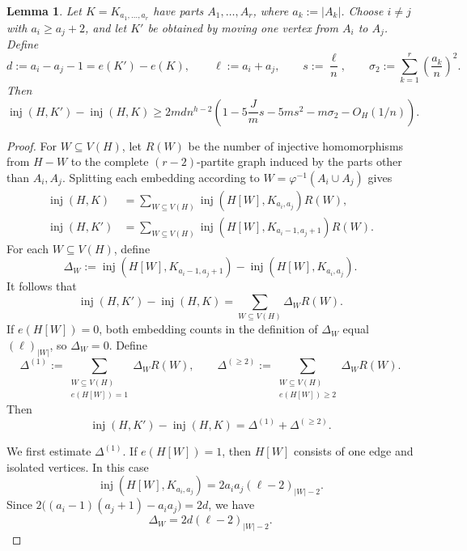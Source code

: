 \documentclass[10pt,a4paper]{amsart}
\newtheorem{lemma}{Lemma}
\newcommand{\inj}{\operatorname{inj}}
\begin{document}
\begin{lemma}
\label{lem:balancing}
Let $K=K_{a_1,\ldots,a_r}$ have parts $A_1,\ldots,A_r$, where $a_k:=|A_k|$. Choose $i\ne j$ with $a_i\ge a_j+2$, and let $K'$ be obtained by moving one vertex from $A_i$ to $A_j$. Define
\[
d:=a_i-a_j-1=e(K')-e(K),\qquad
\ell:=a_i+a_j,\qquad
s:=\frac{\ell}{n},\qquad
\sigma_2:=\sum_{k=1}^r\left(\frac{a_k}{n}\right)^2.
\]
Then
\[
\inj(H,K')-\inj(H,K)
\ge 2mdn^{h-2}\left(1-5\frac{J}{m}s-5ms^2-m\sigma_2-O_H(1/n)\right).
\]
\end{lemma}

\begin{proof}
For $W\subseteq V(H)$, let $R(W)$ be the number of injective homomorphisms from $H-W$ to the complete $(r-2)$-partite graph induced by the parts other than $A_i,A_j$. Splitting each embedding according to $W=\varphi^{-1}(A_i\cup A_j)$ gives
\begin{align*}
\inj(H,K)
&=\sum_{W\subseteq V(H)}\inj(H[W],K_{a_i,a_j})R(W),\\
\inj(H,K')
&=\sum_{W\subseteq V(H)}\inj(H[W],K_{a_i-1,a_j+1})R(W).
\end{align*}
For each $W\subseteq V(H)$, define
\[
\Delta_W:=\inj(H[W],K_{a_i-1,a_j+1})-\inj(H[W],K_{a_i,a_j}).
\]
It follows that
\[
\inj(H,K')-\inj(H,K)=\sum_{W\subseteq V(H)}\Delta_WR(W).
\]
If $e(H[W])=0$, both embedding counts in the definition of $\Delta_W$ equal $(\ell)_{|W|}$, so $\Delta_W=0$. Define
\[
\Delta^{(1)}
:=\sum_{\substack{W\subseteq V(H)\\e(H[W])=1}}\Delta_WR(W),
\qquad
\Delta^{(\ge2)}
:=\sum_{\substack{W\subseteq V(H)\\e(H[W])\ge2}}\Delta_WR(W).
\]
Then
\[
\inj(H,K')-\inj(H,K)=\Delta^{(1)}+\Delta^{(\ge2)}.
\]

We first estimate $\Delta^{(1)}$. If $e(H[W])=1$, then $H[W]$ consists of one edge and isolated vertices. In this case
\[
\inj(H[W],K_{a_i,a_j})
=2a_ia_j(\ell-2)_{|W|-2}.
\]
Since $2\bigl((a_i-1)(a_j+1)-a_ia_j\bigr)=2d$, we have
\begin{equation}
\label{eq:one-edge-delta}
\Delta_W=2d(\ell-2)_{|W|-2}.
\end{equation}


\end{proof}
\end{document}
